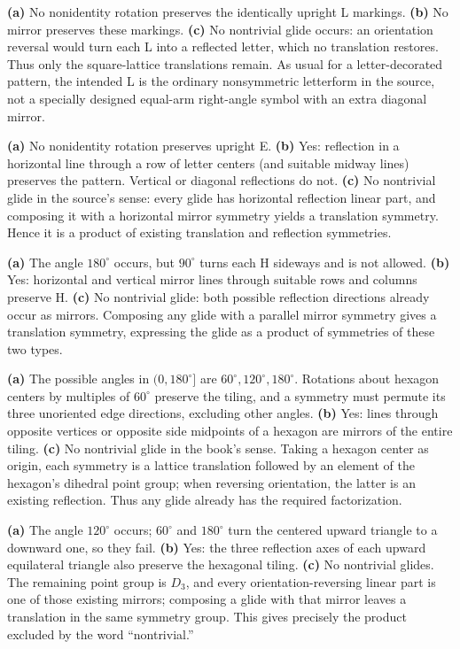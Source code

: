 \textbf{(a)} No nonidentity rotation preserves the identically upright L markings. \textbf{(b)} No mirror preserves these markings. \textbf{(c)} No nontrivial glide occurs: an orientation reversal would turn each L into a reflected letter, which no translation restores. Thus only the square-lattice translations remain. As usual for a letter-decorated pattern, the intended L is the ordinary nonsymmetric letterform in the source, not a specially designed equal-arm right-angle symbol with an extra diagonal mirror.

\textbf{(a)} No nonidentity rotation preserves upright E. \textbf{(b)} Yes: reflection in a horizontal line through a row of letter centers (and suitable midway lines) preserves the pattern. Vertical or diagonal reflections do not. \textbf{(c)} No nontrivial glide in the source's sense: every glide has horizontal reflection linear part, and composing it with a horizontal mirror symmetry yields a translation symmetry. Hence it is a product of existing translation and reflection symmetries.

\textbf{(a)} The angle $180^\circ$ occurs, but $90^\circ$ turns each H sideways and is not allowed. \textbf{(b)} Yes: horizontal and vertical mirror lines through suitable rows and columns preserve H. \textbf{(c)} No nontrivial glide: both possible reflection directions already occur as mirrors. Composing any glide with a parallel mirror symmetry gives a translation symmetry, expressing the glide as a product of symmetries of these two types.

\textbf{(a)} The possible angles in $(0,180^\circ]$ are $60^\circ,120^\circ,180^\circ$. Rotations about hexagon centers by multiples of $60^\circ$ preserve the tiling, and a symmetry must permute its three unoriented edge directions, excluding other angles. \textbf{(b)} Yes: lines through opposite vertices or opposite side midpoints of a hexagon are mirrors of the entire tiling. \textbf{(c)} No nontrivial glide in the book's sense. Taking a hexagon center as origin, each symmetry is a lattice translation followed by an element of the hexagon's dihedral point group; when reversing orientation, the latter is an existing reflection. Thus any glide already has the required factorization.

\textbf{(a)} The angle $120^\circ$ occurs; $60^\circ$ and $180^\circ$ turn the centered upward triangle to a downward one, so they fail. \textbf{(b)} Yes: the three reflection axes of each upward equilateral triangle also preserve the hexagonal tiling. \textbf{(c)} No nontrivial glides. The remaining point group is $D_3$, and every orientation-reversing linear part is one of those existing mirrors; composing a glide with that mirror leaves a translation in the same symmetry group. This gives precisely the product excluded by the word ``nontrivial.''


